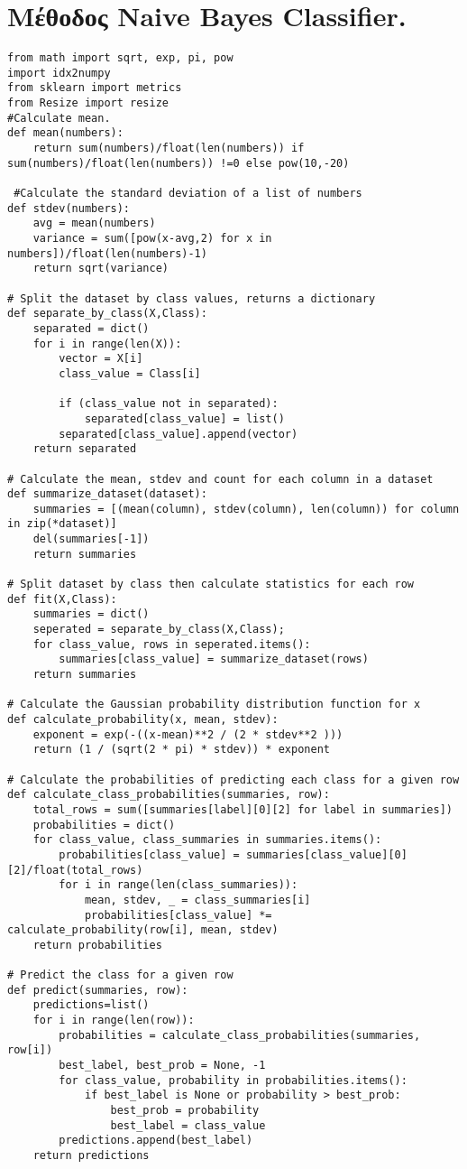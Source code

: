 \documentclass{article}[40pt]
\newcommand{\en}{\selectlanguage{english}}
\newcommand{\gr}{\selectlanguage{greek}}
\begin{document}
\section{\gr Μέθοδος \en Naive Bayes Classifier.}
\begin{lstlisting}[style=PStyle]
from math import sqrt, exp, pi, pow
import idx2numpy
from sklearn import metrics
from Resize import resize
#Calculate mean.
def mean(numbers):
	return sum(numbers)/float(len(numbers)) if sum(numbers)/float(len(numbers)) !=0 else pow(10,-20)

 #Calculate the standard deviation of a list of numbers
def stdev(numbers):
	avg = mean(numbers)
	variance = sum([pow(x-avg,2) for x in numbers])/float(len(numbers)-1)
	return sqrt(variance)

# Split the dataset by class values, returns a dictionary
def separate_by_class(X,Class):
	separated = dict()
	for i in range(len(X)):
		vector = X[i]
		class_value = Class[i]

		if (class_value not in separated):
			separated[class_value] = list()
		separated[class_value].append(vector)
	return separated

# Calculate the mean, stdev and count for each column in a dataset
def summarize_dataset(dataset):
	summaries = [(mean(column), stdev(column), len(column)) for column in zip(*dataset)]
	del(summaries[-1])
	return summaries

# Split dataset by class then calculate statistics for each row
def fit(X,Class):
    summaries = dict()
    seperated = separate_by_class(X,Class);
    for class_value, rows in seperated.items():
        summaries[class_value] = summarize_dataset(rows)
    return summaries

# Calculate the Gaussian probability distribution function for x
def calculate_probability(x, mean, stdev):
	exponent = exp(-((x-mean)**2 / (2 * stdev**2 )))
	return (1 / (sqrt(2 * pi) * stdev)) * exponent
 
# Calculate the probabilities of predicting each class for a given row
def calculate_class_probabilities(summaries, row):
	total_rows = sum([summaries[label][0][2] for label in summaries])
	probabilities = dict()
	for class_value, class_summaries in summaries.items():
		probabilities[class_value] = summaries[class_value][0][2]/float(total_rows)
		for i in range(len(class_summaries)):
			mean, stdev, _ = class_summaries[i]
			probabilities[class_value] *= calculate_probability(row[i], mean, stdev)
	return probabilities
 
# Predict the class for a given row
def predict(summaries, row):	
	predictions=list()
	for i in range(len(row)):
		probabilities = calculate_class_probabilities(summaries, row[i])
		best_label, best_prob = None, -1
		for class_value, probability in probabilities.items():
			if best_label is None or probability > best_prob:
				best_prob = probability
				best_label = class_value
		predictions.append(best_label)		
	return predictions    



\end{lstlisting}
\end{document}
